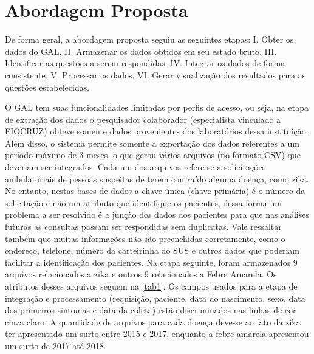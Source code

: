 \chapter{Abordagem Proposta}

De forma geral, a abordagem proposta seguiu as seguintes etapas:
I.	Obter os dados do GAL.
II.	Armazenar os dados obtidos em seu estado bruto.
III.	Identificar as questões a serem respondidas.
IV.	Integrar os dados de forma consistente.
V.	Processar os dados.
VI.	Gerar visualização dos resultados para as questões estabelecidas.

O GAL tem suas funcionalidades limitadas por perfis de acesso, ou seja, na etapa de extração dos dados o pesquisador colaborador (especialista vinculado a FIOCRUZ) obteve somente dados provenientes dos laboratórios dessa instituição. Além disso, o sistema permite somente a exportação dos dados referentes a um período máximo de 3 meses, o que gerou vários arquivos (no formato CSV) que deveriam ser integrados. Cada um dos arquivos refere-se a solicitações ambulatoriais de pessoas suspeitas de terem contraído alguma doença, como zika. No entanto, nestas bases de dados a chave única (chave primária) é o número da solicitação e não um atributo que identifique os pacientes, dessa forma um problema a ser resolvido é a junção dos dados dos pacientes para que nas análises futuras as consultas possam ser respondidas sem duplicatas. Vale ressaltar também que muitas informações não são preenchidas corretamente, como o endereço, telefone, número da carteirinha do SUS e outros dados que poderiam facilitar a identificação dos pacientes.
Na etapa seguinte, foram armazenados 9 arquivos relacionados a zika e outros 9 relacionados a Febre Amarela. Os atributos desses arquivos seguem na \ref{tab1}. Os campos usados para a etapa de integração e processamento (requisição, paciente, data do nascimento, sexo, data dos primeiros sintomas e data da coleta) estão discriminados nas linhas de cor cinza claro. A quantidade de arquivos para cada doença deve-se ao fato da zika ter apresentado um surto entre 2015 e 2017, enquanto a febre amarela apresentou um surto de 2017 até 2018.

